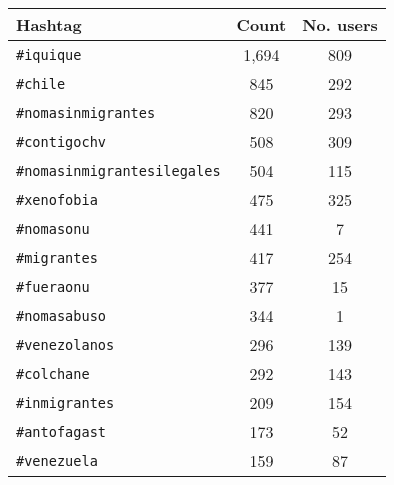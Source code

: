 %
    
    \begin{tabular}{lcc}
        \toprule\toprule
        Hashtag & Count & No. users\\ \midrule
        \texttt{\#iquique} & 1,694 & 809 \\ 
        \texttt{\#chile} & 845 & 292 \\ 
        \texttt{\#nomasinmigrantes} &  820 & 293 \\ 
        \texttt{\#contigochv} &  508 & 309 \\
        \texttt{\#nomasinmigrantesilegales} & 504 & 115 \\ 
        \texttt{\#xenofobia} & 475 & 325 \\ 
        \texttt{\#nomasonu} & 441 & 7 \\ 
        \texttt{\#migrantes} & 417 & 254 \\
        \texttt{\#fueraonu} & 377 & 15 \\ 
        \texttt{\#nomasabuso} & 344 & 1 \\
        \texttt{\#venezolanos} & 296 & 139 \\ 
        \texttt{\#colchane} & 292 & 143 \\ 
        \texttt{\#inmigrantes} & 209 & 154 \\
        \texttt{\#antofagast} & 173 & 52 \\
        \texttt{\#venezuela} & 159 & 87 \\
        \bottomrule\bottomrule
    \end{tabular}

%